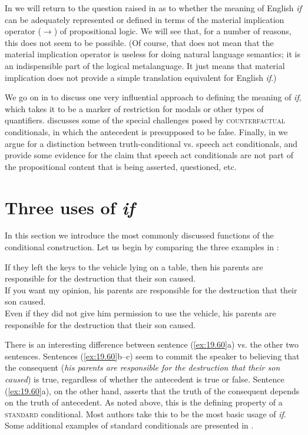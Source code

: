 In  we will return to the question raised in  as to whether the meaning of English \textit{if} can be adequately represented or defined in terms of the material implication operator ($\rightarrow$) of propositional logic. We will see that, for a number of reasons, this does not seem to be possible. (Of course, that does not mean that the material implication operator is useless for doing natural language semantics; it is an indispensible part of the logical metalanguage. It just means that material implication does not provide a simple translation equivalent for English \textit{if}.)



We go on in  to discuss one very influential approach to defining the meaning of \textit{if}, which takes it to be a marker of restriction for modals or other types of quantifiers.  discusses some of the special challenges posed by \textsc{counterfactual} conditionals, in which the antecedent is presupposed to be false. Finally, in  we argue for a distinction between truth-conditional vs. speech act conditionals, and provide some evidence for the claim that speech act conditionals are not part of the propositional content that is being asserted, questioned, etc.


\section{Three uses of \textit{if}}\label{sec:19.2}

In this section we introduce the most commonly discussed functions of the conditional construction. Let us begin by comparing the three examples in :


\ea \label{ex:19.60}
\ea  If they left the keys to the vehicle lying on a table, then his parents are responsible for the destruction that their son caused.\\
\ex If you want my opinion, his parents are responsible for the destruction that their son caused.\\
\ex Even if they did not give him permission to use the vehicle, his parents are responsible for the destruction that their son caused.
                       \z
\z


There is an interesting difference between sentence (\ref{ex:19.60}a) vs. the other two sentences. Sentences (\ref{ex:19.60}b–c) seem to commit the speaker to believing that the consequent (\textit{his parents are responsible for the destruction that their son caused}) is true, regardless of whether the antecedent is true or false. Sentence (\ref{ex:19.60}a), on the other hand, asserts that the truth of the consequent depends on the truth of antecedent. As noted above, this is the defining property of a \textsc{standard} conditional. Most authors take this to be the most basic usage of \textit{if}. Some additional examples of standard conditionals are presented in . 


